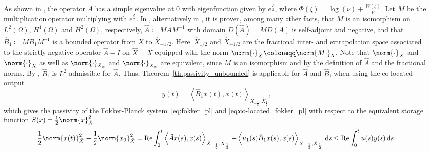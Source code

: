 \documentclass{cocv}
\renewcommand{\Re}{\mathrm{Re}}
\newcommand{\ds}{ {\, \rm d} s}
\newcommand{\inprod}[2]{\left\langle#1,#2\right\rangle}
\theoremstyle{definition}
\begin{document}
    As shown in \cite{Breiten18}, the operator $A$ has a simple eigenvalue at $0$ with eigenfunction given by $e^{\frac\Phi2}$, where $\Phi(\xi) = \log(\nu) + \frac{W(\xi)}{\nu}$. Let $M$ be the multiplication operator multiplying with $e^{\frac\Phi2}$. In \cite[Ch.~3]{MR4440806}, alternatively in \cite[Sec.~5.2]{hosfeld25}, it is proven, among many other facts, that $M$ is an isomorphism on $L^2(\Omega)$, $H^1(\Omega)$ and $H^2(\Omega)$, respectively, $\hat A \coloneqq MAM^{-1}$ with domain $D(\hat A) = MD(A)$ is self-adjoint and negative, and that $\hat B_1 \coloneqq MB_1M^{-1}$ is a bounded operator from $X$ to $\hat X_{-1/2}$. Here, $\hat X_{1/2}$ and $\hat X_{-1/2}$ are the fractional inter- and extrapolation space associated to the strictly negative operator $\hat{A}- I$ on $\hat{X}=X$ equipped with the norm $\norm{\cdot}_{\hat X} \coloneqq \norm{M\cdot}_{X}$. Note that $\norm{\cdot}_X$ and $\norm{\cdot}_{\hat X}$ as well as $\norm{\cdot}_{\hat X_\alpha}$ and $\norm{\cdot}_{X_\alpha}$ are equivalent, since $M$ is an isomorphism and by the definition of $\hat{A}$ and the fractional norms. By \cite[Prop.~5.1.3.]{MR2502023}, $\hat B_1$ is $L^2$-admissible for $\hat A$. Thus, Theorem~\ref{th:passivity_unbounded} is applicable for $\hat A$ and $\hat B_1$ when using  the co-located output 
    \begin{equation}
    \label{eq:co-located_fokker_pl}
        y(t) = \inprod{\hat B_1x(t)}{x(t)}_{\hat X_{-\frac12}, \hat X_{\frac12}},
    \end{equation}
    which gives the passivity of the Fokker-Planck system~\eqref{eq:fokker_pl} and \eqref{eq:co-located_fokker_pl} with respect to the equivalent storage function $S(x) = \frac12 \norm{x}_{\hat X}^2$ 
    \begin{equation*}
        \begin{aligned}
            \frac12\norm{x(t)}_{\hat X}^2 - \frac12\norm{x_0}_{\hat X}^2
= \Re\int_0^t \inprod{\hat Ax(s)}{x(s)}_{\hat X_{-\frac12}, \hat X_{\frac12}} + \inprod{u_1(s)\hat B_1x(s)}{ x(s)}_{\hat X_{-\frac12}, \hat X_{\frac12}} \ds 
\le \Re \int_0^t u(s)y(s) \ds.
        \end{aligned}
    \end{equation*}
\end{document}
